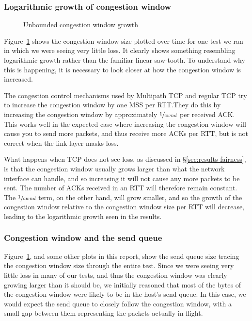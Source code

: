 \subsubsection{Logarithmic growth of congestion window}

\begin{figure}[h]
 \centering
 
 \caption{Unbounded congestion window growth}\label{graph:logarithmic}
\end{figure}

Figure~\ref{graph:logarithmic} shows the congestion window size plotted over
time for one test we ran in which we were seeing very little loss. It clearly
shows something resembling logarithmic growth rather than the familiar linear
saw-tooth. To understand why this is happening, it is necessary to look closer
at how the congestion window is increased.

The congestion control mechanisms used by Multipath TCP and regular TCP try to
increase the congestion window by one MSS per RTT.\@ They do this by increasing
the congestion window by approximately $\sfrac{1}{cwnd}$ per received ACK.\@
This works well in the expected case where increasing the congestion window will
cause you to send more packets, and thus receive more ACKs per RTT, but is not
correct when the link layer masks loss.

What happens when TCP does not see loss, as discussed in \S\ref{sec:results-fairness}, 
is that the congestion window usually grows larger than what the network 
interface can handle, and so increasing it will not cause any more packets to be 
sent. The number of ACKs received in an RTT will therefore remain constant. The 
$\sfrac{1}{cwnd}$ term, on the other hand, will grow smaller, and so the growth of the 
congestion window relative to the congestion window size per RTT will decrease, 
leading to the logarithmic growth seen in the results.

\subsubsection{Congestion window and the send queue}
\label{sec:closing:sendq}
Figure~\ref{graph:logarithmic}, and some other plots in this report, show the
send queue size tracing the congestion window size through the entire test.
Since we were seeing very little loss in many of our tests, and thus the
congestion window was clearly growing larger than it should be, we initially
reasoned that most of the bytes of the congestion window were likely to be in
the host's send queue. In this case, we would expect the send queue to closely
follow the congestion window, with a small gap between them representing the
packets actually in flight.


